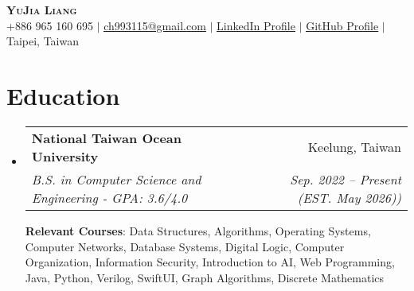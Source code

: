 \documentclass[letterpaper,11pt]{article}
\makeatletter
\newcommand{\resumeItem}[1]{
  \item\small{
    {#1 \vspace{-2pt}}
  }
}
\newcommand{\resumeSubheading}[4]{
  \vspace{-2pt}\item
    \begin{tabular*}{0.97\textwidth}[t]{l@{\extracolsep{\fill}}r}
      \textbf{#1} & #2 \\
      \textit{\small#3} & \textit{\small #4} \\
    \end{tabular*}\vspace{-7pt}
}
\newcommand{\resumeSubHeadingListStart}{\begin{itemize}[leftmargin=0.15in, label={}]}
\newcommand{\resumeSubHeadingListEnd}{\end{itemize}}
\newcommand{\resumeItemListStart}{\begin{itemize}}
\newcommand{\resumeItemListEnd}{\end{itemize}\vspace{-5pt}}
\makeatother
\begin{document}

\begin{center}
    \textbf{\Huge \scshape YuJia Liang} \\ \vspace{1pt}
    \small +886 965 160 695 $|$ \href{mailto:ch993115@gmail.com}{\underline{ch993115@gmail.com}} $|$ \href{https://www.linkedin.com/in/yu-jia-liang-77ab022a7}{\underline{LinkedIn Profile}} $|$ \href{https://github.com/itsYoga}{\underline{GitHub Profile}}
    $|$ {\small{Taipei, Taiwan}}
\end{center}


\section{Education}
  \resumeSubHeadingListStart
    \resumeSubheading
      {National Taiwan Ocean University}{Keelung, Taiwan}
      {B.S. in Computer Science and Engineering - GPA: 3.6/4.0} {Sep. 2022 -- Present (EST. May 2026))}\hfill \break

  \textbf{Relevant Courses}{: Data Structures, Algorithms, Operating Systems, Computer Networks, Database Systems, Digital Logic, Computer Organization, Information Security, Introduction to AI, Web Programming, Java, Python, Verilog, SwiftUI, Graph Algorithms, Discrete Mathematics} 

  \resumeSubHeadingListEnd


      
\end{document}
